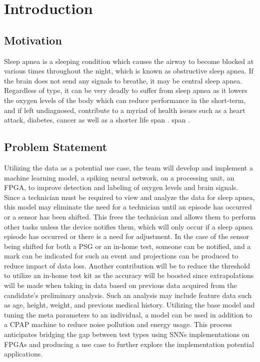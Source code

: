 \documentclass[12pt,titlepage]{article}
\begin{document}
\section{Introduction}
\subsection{Motivation}
Sleep apnea is a sleeping condition which causes the airway to become blocked at various times throughout the night, which is known as obstructive sleep apnea. If the brain does not send any signals to breathe, it may be central sleep apnea. Regardless of type, it can be very deadly to suffer from sleep apnea as it lowers the oxygen levels of the body which can reduce performance in the short-term, and if left undiagnosed, contribute to a myriad of health issues such as a heart attack, diabetes, cancer as well as a shorter life span \cite{hopkins}. 
span \cite{hopkins}.
\subsection{Problem Statement}
Utilizing the data as a potential use case, the team will develop and implement a machine learning model, a spiking neural network, on a processing unit, an FPGA, to improve detection and labeling of oxygen levels and brain signals.  Since a technician must be required to view and analyze the data for sleep apnea, this model may eliminate the need for a technician until an episode has occurred or a sensor has been shifted. This frees the technician and allows them to perform other tasks unless the device notifies them, which will only occur if a sleep apnea episode has occurred or there is a need for adjustment. In the case of the sensor being shifted for both a PSG or an in-home test, someone can be notified, and a mark can be indicated for such an event and projections can be produced to reduce impact of data loss. Another contribution will be to reduce the threshold to utilize an in-home test kit as the accuracy will be boosted since extrapolations will be made when taking in data based on previous data acquired from the candidate’s preliminary analysis. Such an analysis may include feature data such as age, height, weight, and previous medical history. Utilizing the base model and tuning the meta parameters to an individual, a model can be used in addition to a CPAP machine to reduce noise pollution and energy usage. This process anticipates bridging the gap between test types using SNNs implementations on FPGAs and producing a use case to further explore the implementation potential applications.  
\end{document}
